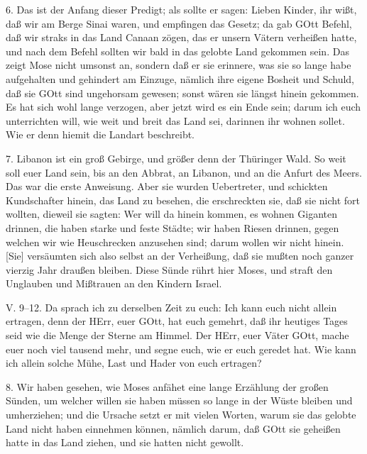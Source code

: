 6. Das ist der Anfang dieser Predigt; als sollte er sagen: Lieben Kinder, ihr wißt, daß wir am Berge Sinai waren, und empfingen das Gesetz; da gab GOtt Befehl, daß wir straks in das Land Canaan zögen, das er unsern Vätern verheißen hatte, und nach dem Befehl sollten wir bald in das gelobte Land gekommen sein. Das zeigt Mose nicht umsonst an, sondern daß er sie erinnere, was sie so lange habe aufgehalten und gehindert am Einzuge, nämlich ihre eigene Bosheit und Schuld, daß sie GOtt sind ungehorsam gewesen; sonst wären sie längst hinein gekommen. Es hat sich wohl lange verzogen, aber jetzt wird es ein Ende sein; darum ich euch unterrichten will, wie weit und breit das Land sei, darinnen ihr wohnen sollet. Wie er denn hiemit die Landart beschreibt.

7. Libanon ist ein groß Gebirge, und größer denn der Thüringer Wald. So weit soll euer Land sein, bis an den Abbrat, an Libanon, und an die Anfurt des Meers. Das war die erste Anweisung. Aber sie wurden Uebertreter, und schickten Kundschafter hinein, das Land zu besehen, die erschreckten sie, daß sie nicht fort wollten, dieweil sie sagten: Wer will da hinein kommen, es wohnen Giganten drinnen, die haben starke und feste Städte; wir haben Riesen drinnen, gegen welchen wir wie Heuschrecken anzusehen sind; darum wollen wir nicht hinein. [Sie] versäumten sich also selbst an der Verheißung, daß sie mußten noch ganzer vierzig Jahr draußen bleiben. Diese Sünde rührt hier Moses, und straft den Unglauben und Mißtrauen an den Kindern Israel.

\begin{schriftzitat}
V. 9–12. Da sprach ich zu derselben Zeit zu euch: Ich kann euch nicht allein ertragen, denn der HErr, euer GOtt, hat euch gemehrt, daß ihr heutiges Tages seid wie die Menge der Sterne am Himmel. Der HErr, euer Väter GOtt, mache euer noch viel tausend mehr, und segne euch, wie er euch geredet hat. Wie kann ich allein solche Mühe, Last und Hader von euch ertragen?
\end{schriftzitat}

8. Wir haben gesehen, wie Moses anfähet eine lange Erzählung der großen Sünden, um welcher willen sie haben müssen so lange in der Wüste bleiben und umherziehen; und die Ursache setzt er mit vielen Worten, warum sie das gelobte Land nicht haben einnehmen können, nämlich darum, daß GOtt sie geheißen hatte in das Land ziehen, und sie hatten nicht gewollt.

